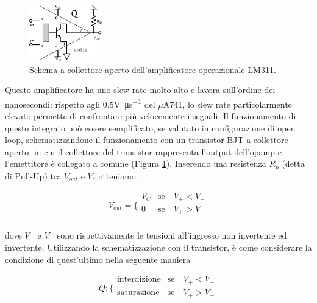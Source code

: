 \begin{figure}
  \begin{center}
    \includegraphics[width=0.280\textwidth]{../E04/latex/c_LM311.pdf}
  \end{center}
  \caption{Schema a collettore aperto dell'amplificatore operazionale LM311.}
  \label{cir4:open_collector}
\end{figure}

Questo amplificatore ha uno slew rate molto alto e lavora sull'ordine dei nanosecondi: rispetto agli $0.5$\si{\volt\per\micro\second} del $\mu$A741, lo slew rate particolarmente elevato permette di confrontare più velocemente i segnali.
Il funzionamento di questo integrato può essere semplificato, se valutato in configurazione di open loop, schematizzandone il funzionamento con un transistor BJT a collettore aperto, in cui il collettore del transistor rappresenta l'output dell'opamp e l'emettitore è collegato a comune (Figura \ref{cir4:open_collector}).
Inserendo una resistenza $R_p$ (detta di Pull-Up) tra $V_{out}$ e $V_c$ otteniamo:

\begin{equation}
V_{out} = \bigg \{
\begin{array}{rl}
V_C & \mathrm{se} \quad V_+ < V_- \\
0 & \mathrm{se} \quad V_+ > V_- \\
\end{array}
\label{eq4:comparatore}
\end{equation}

dove $V_+$ e $V_-$ sono rispettivamente le tensioni all'ingresso non invertente ed invertente. Utilizzando la schematizzazione con il transistor, è come considerare la condizione di quest'ultimo nella seguente maniera

\begin{equation}
Q : \bigg \{
\begin{array}{rl}
\mathrm{interdizione} & \mathrm{se} \quad V_+ < V_- \\
\mathrm{saturazione} & \mathrm{se} \quad V_+ > V_- \\
\end{array}
\label{eq4:comparatore_Q}
\end{equation}

